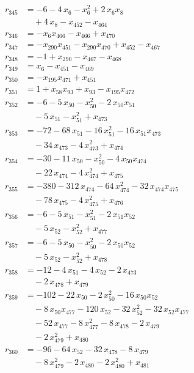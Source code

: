 \begin{align*}
r_{345} &= -6 - 4\,x_{6} - x_{6}^{2} + 2\,x_{6} x_{8} \\
&\quad{}+ 4\,x_{8} - x_{452} - x_{464} \\
r_{346} &= -x_{6} x_{466} - x_{466} + x_{470} \\
r_{347} &= -x_{290} x_{451} - x_{290} x_{470} + x_{452} - x_{467} \\
r_{348} &= -1 + x_{290} - x_{467} - x_{468} \\
r_{349} &= x_{6} - x_{451} - x_{469} \\
r_{350} &= -x_{195} x_{471} + x_{451} \\
r_{351} &= 1 + x_{58} x_{93} + x_{93} - x_{195} x_{472} \\
r_{352} &= -6 - 5\,x_{50} - x_{50}^{2} - 2\,x_{50} x_{51} \\
&\quad{}- 5\,x_{51} - x_{51}^{2} + x_{473} \\
r_{353} &= -72 - 68\,x_{51} - 16\,x_{51}^{2} - 16\,x_{51} x_{473} \\
&\quad{}- 34\,x_{473} - 4\,x_{473}^{2} + x_{474} \\
r_{354} &= -30 - 11\,x_{50} - x_{50}^{2} - 4\,x_{50} x_{474} \\
&\quad{}- 22\,x_{474} - 4\,x_{474}^{2} + x_{475} \\
r_{355} &= -380 - 312\,x_{474} - 64\,x_{474}^{2} - 32\,x_{474} x_{475} \\
&\quad{}- 78\,x_{475} - 4\,x_{475}^{2} + x_{476} \\
r_{356} &= -6 - 5\,x_{51} - x_{51}^{2} - 2\,x_{51} x_{52} \\
&\quad{}- 5\,x_{52} - x_{52}^{2} + x_{477} \\
r_{357} &= -6 - 5\,x_{50} - x_{50}^{2} - 2\,x_{50} x_{52} \\
&\quad{}- 5\,x_{52} - x_{52}^{2} + x_{478} \\
r_{358} &= -12 - 4\,x_{51} - 4\,x_{52} - 2\,x_{473} \\
&\quad{}- 2\,x_{478} + x_{479} \\
r_{359} &= -102 - 22\,x_{50} - 2\,x_{50}^{2} - 16\,x_{50} x_{52} \\
&\quad{}- 8\,x_{50} x_{477} - 120\,x_{52} - 32\,x_{52}^{2} - 32\,x_{52} x_{477} \\
&\quad{}- 52\,x_{477} - 8\,x_{477}^{2} - 8\,x_{478} - 2\,x_{479} \\
&\quad{}- 2\,x_{479}^{2} + x_{480} \\
r_{360} &= -96 - 64\,x_{52} - 32\,x_{478} - 8\,x_{479} \\
&\quad{}- 8\,x_{479}^{2} - 2\,x_{480} - 2\,x_{480}^{2} + x_{481} \\

\end{align*}
